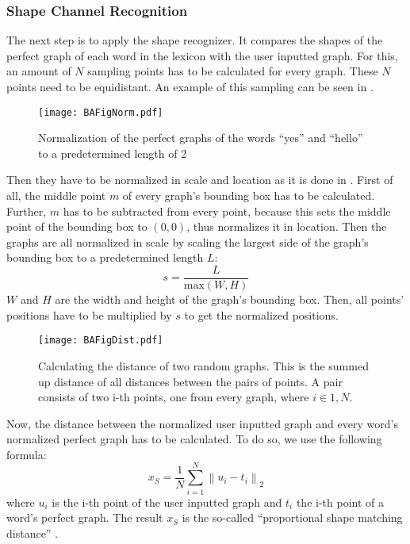 \subsubsection{Shape Channel Recognition}
\label{normalize}
The next step is to apply the shape recognizer. It compares the shapes of the perfect graph of each word in the lexicon with the user inputted graph. For this, an amount of $N$ sampling points has to be calculated for every graph. These $N$ points need to be equidistant. An example of this sampling can be seen in .
\begin{figure}[H]
    \centering
    \texttt{[image: BAFigNorm.pdf]}
    \caption{Normalization of the perfect graphs of the words ``yes'' and ``hello'' to a predetermined length of 2}
    \label{fig:Norm}
\end{figure}
Then they have to be normalized in scale and location as it is done in . First of all, the middle point $m$ of every graph's bounding box has to be calculated. Further, $m$ has to be subtracted from every point, because this sets the middle point of the bounding box to $(0,0)$, thus normalizes it in location. Then the graphs are all normalized in scale by scaling the largest side of the graph's bounding box to a predetermined length $L$: 
\begin{equation}
    s = \frac{L}{\text{max}(W,H)}
\end{equation}
$W$ and $H$ are the width and height of the graph's bounding box.  Then, all points' positions have to be multiplied by $s$ to get the normalized positions. 
\begin{figure}[H]
    \centering
    \texttt{[image: BAFigDist.pdf]}
    \caption{Calculating the distance of two random graphs. This is the summed up distance of all distances between the pairs of points. A pair consists of two i-th points, one from every graph, where $i \in {1,N}$. }
    \label{fig:Distance}
\end{figure}
Now, the distance between the normalized user inputted graph and every word's normalized perfect graph has to be calculated. To do so, we use the following formula:
\begin{equation}
    x_S = \frac{1}{N}\sum_{i = 1}^{N}\left\lVert u_i - t_i\right\rVert_2
\end{equation}
where $u_i$ is the i-th point of the user inputted graph and $t_i$ the i-th point of a word's perfect graph. The result $x_S$ is the so-called ``proportional shape matching distance'' \cite{Kristensson2004SHARK2AL}.\\

